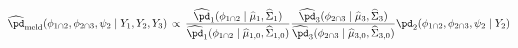 \begin{equation}
  \widehat{\pd}_{\text{meld}} (\phi_{1 \cap 2}, \phi_{2 \cap 3}, \psi_{2} \mid Y_{1}, Y_{2}, Y_{3})
  \, \propto \,
  \frac {
    \widehat{\pd}_{1}(\phi_{1 \cap 2} \mid \widehat{\mu}_{1}, \widehat{\Sigma}_{1})
  } {
    \widehat{\pd}_{1}(\phi_{1 \cap 2} \mid \widehat{\mu}_{1, 0}, \widehat{\Sigma}_{1, 0})
  }
  \frac {
    \widehat{\pd}_{3}(\phi_{2 \cap 3} \mid \widehat{\mu}_{3}, \widehat{\Sigma}_{3})
  } {
    \widehat{\pd}_{3}(\phi_{2 \cap 3} \mid \widehat{\mu}_{3, 0}, \widehat{\Sigma}_{3, 0})
  }
  \pd_{2}(\phi_{1 \cap 2}, \phi_{2 \cap 3}, \psi_{2} \mid Y_{2})
  \label{eqn:normal-approximation-approximate-target}
\end{equation}